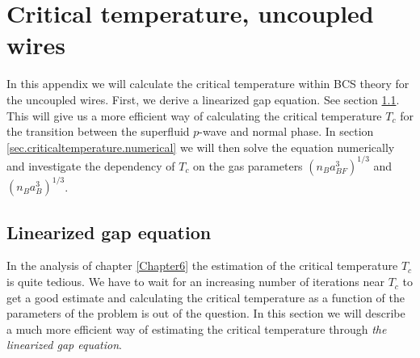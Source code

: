 \chapter{Critical temperature, uncoupled wires} %

\label{Appendix.criticaltemperature} %


In this appendix we will calculate the critical temperature within BCS theory for the uncoupled wires. First, we derive a linearized gap equation. See section \ref{sec.linearizedgapequation}. This will give us a more efficient way of calculating the critical temperature $T_c$ for the transition between the superfluid $p$-wave and normal phase. In section \ref{sec.criticaltemperature.numerical} we will then solve the equation numerically and investigate the dependency of $T_c$ on the gas parameters $(n_Ba_{BF}^3)^{1/3}$ and $(n_Ba_B^3)^{1/3}$. 

\section{Linearized gap equation} \label{sec.linearizedgapequation}
In the analysis of chapter \ref{Chapter6} the estimation of the critical temperature $T_c$ is quite tedious. We have to wait for an increasing number of iterations near $T_c$ to get a good estimate and calculating the critical temperature as a function of the parameters of the problem is out of the question. In this section we will describe a much more efficient way of estimating the critical temperature through \textit{the linearized gap equation}. 

